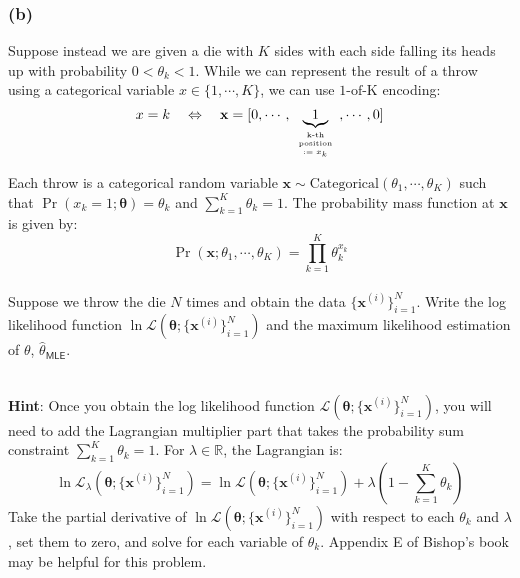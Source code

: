 \documentclass[11pt]{article}
\begin{document}
\vfill 

\subsubsection*{(b)}
	
	Suppose instead we are given a die with $K$ sides with each side falling its heads up with
	probability $0 < \theta_k < 1$. While we can represent the result of a throw using
	a categorical variable $x \in \{1, \cdots, K\}$, we can use $\mbox{1-of-K}$ encoding:
	$$x = k \ \ \ \Leftrightarrow \ \ \ \mathbf{x} = [0, \cdots, 
	\underbrace{1}_{\tiny \begin{array}{c} 
		\mbox{k-th}\\
		\mbox{position}\\
		:= x_k
		\end{array}}, \cdots, 0]$$
	
	Each throw is a categorical random variable
	$\mathbf{x} \sim \mathrm{Categorical}(\theta_1, \cdots, \theta_K)$ such that
	$\Pr(x_k = 1; \mathbf{\theta}) = \theta_k$ and $\sum\limits_{k = 1}^K \theta_k = 1$.
	The probability mass function at $\mathbf{x}$ is given by: $$\Pr( \mathbf{x}; \theta_1, \cdots, \theta_K)
	 = \prod\limits_{k = 1}^K \theta_k ^{x_k}$$
	\ \\
	Suppose we throw the die $N$ times and obtain the data
	$\{ \mathbf{x}^{(i)} \}_{i = 1}^N$.	
	Write the log likelihood function $\ln \mathcal{L}(
	\mathbf{\theta}; \{ \mathbf{x}^{(i)}\}_{i = 1}^N )$ and 
	the maximum likelihood estimation of $\theta$,  $\hat{\theta}_{\mathsf{MLE}}$. 
	
	\ \\
	{\bf Hint}: Once you obtain the log likelihood function 
	$\mathcal{L}(
	\mathbf{\theta}; \{ \mathbf{x}^{(i)}\}_{i = 1}^N )$, you will need to add the Lagrangian multiplier part that takes 
	the probability sum constraint $\sum\limits_{k = 1}^K \theta_k = 1$. For $\lambda \in \mathbb{R}$,
	the Lagrangian is:
	$$\ln \mathcal{L}_{\lambda}(\mathbf{\theta}; \{ \mathbf{x}^{(i)}\}_{i = 1}^N) = 
	\ln \mathcal{L}(\mathbf{\theta}; \{ \mathbf{x}^{(i)}\}_{i = 1}^N) + 
	\lambda \left (1 - \sum\limits_{k = 1}^K \theta_k \right )$$
	Take the partial derivative of $\ln \mathcal{L}(
	\mathbf{\theta}; \{ \mathbf{x}^{(i)}\}_{i = 1}^N )$ with respect to each $\theta_k$ and $\lambda$, set them to zero,
	and solve for each variable of $\theta_k$. Appendix E of Bishop's book may be helpful for
	this problem.
	
\end{document}
